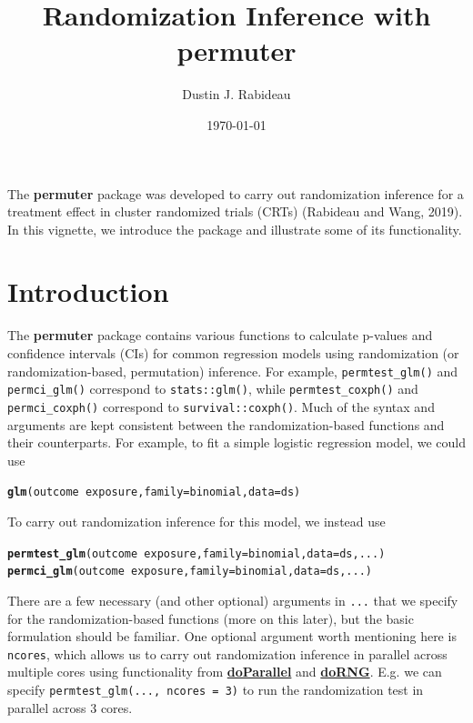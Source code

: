 \documentclass[12pt]{article}\usepackage[]{graphicx}\usepackage[]{color}
\title{Randomization Inference with \textbf{permuter}}
\author{Dustin J. Rabideau}
\date{\today}
\makeatletter
\newcommand{\hlopt}[1]{\textcolor[rgb]{0,0,0}{#1}}%
\newcommand{\hlstd}[1]{\textcolor[rgb]{0.345,0.345,0.345}{#1}}%
\newcommand{\hlkwc}[1]{\textcolor[rgb]{0.333,0.667,0.333}{#1}}%
\newcommand{\hlkwd}[1]{\textcolor[rgb]{0.737,0.353,0.396}{\textbf{#1}}}%
\newenvironment{kframe}{%
 \def\at@end@of@kframe{}%
 \ifinner\ifhmode%
  \def\at@end@of@kframe{\end{minipage}}%
  \begin{minipage}{\columnwidth}%
 \fi\fi%
 \def\FrameCommand##1{\hskip\@totalleftmargin \hskip-\fboxsep
 \colorbox{shadecolor}{##1}\hskip-\fboxsep
     \hskip-\linewidth \hskip-\@totalleftmargin \hskip\columnwidth}%
 \MakeFramed {\advance\hsize-\width
   \@totalleftmargin\z@ \linewidth\hsize
   \@setminipage}}%
 {\par\unskip\endMakeFramed%
 \at@end@of@kframe}
\newenvironment{knitrout}{}{} %
\makeatother
\begin{document}
\maketitle

The \textbf{permuter} package was developed to carry out randomization inference for a treatment effect in cluster randomized trials (CRTs) (Rabideau and Wang, 2019). In this vignette, we introduce the package and illustrate some of its functionality.

\section{Introduction}
The \textbf{permuter} package contains various functions to calculate p-values and confidence intervals (CIs) for common regression models using randomization (or randomization-based, permutation) inference. For example, \texttt{permtest\_glm()} and \texttt{permci\_glm()} correspond to \texttt{stats::glm()}, while \texttt{permtest\_coxph()} and \texttt{permci\_coxph()} correspond to \texttt{survival::coxph()}. Much of the syntax and arguments are kept consistent between the randomization-based functions and their counterparts. For example, to fit a simple logistic regression model, we could use
\begin{knitrout}
\color{fgcolor}\begin{kframe}
\begin{alltt}
\hlkwd{glm}\hlstd{(outcome} \hlopt{~} \hlstd{exposure,} \hlkwc{family} \hlstd{= binomial,} \hlkwc{data} \hlstd{= ds)}
\end{alltt}
\end{kframe}
\end{knitrout}
To carry out randomization inference for this model, we instead use
\begin{knitrout}
\color{fgcolor}\begin{kframe}
\begin{alltt}
\hlkwd{permtest_glm}\hlstd{(outcome} \hlopt{~} \hlstd{exposure,} \hlkwc{family} \hlstd{= binomial,} \hlkwc{data} \hlstd{= ds, ...)}
\hlkwd{permci_glm}\hlstd{(outcome} \hlopt{~} \hlstd{exposure,} \hlkwc{family} \hlstd{= binomial,} \hlkwc{data} \hlstd{= ds, ...)}
\end{alltt}
\end{kframe}
\end{knitrout}
There are a few necessary (and other optional) arguments in \texttt{...} that we specify for the randomization-based functions (more on this later), but the basic formulation should be familiar. One optional argument worth mentioning here is \texttt{ncores}, which allows us to carry out randomization inference in parallel across multiple cores using functionality from \href{https://cran.r-project.org/web/packages/doParallel/index.html}{\textbf{doParallel}} and \href{https://cran.r-project.org/web/packages/doRNG/index.html}{\textbf{doRNG}}. E.g. we can specify \texttt{permtest\_glm(..., ncores = 3)} to run the randomization test in parallel across 3 cores.
\end{document}
